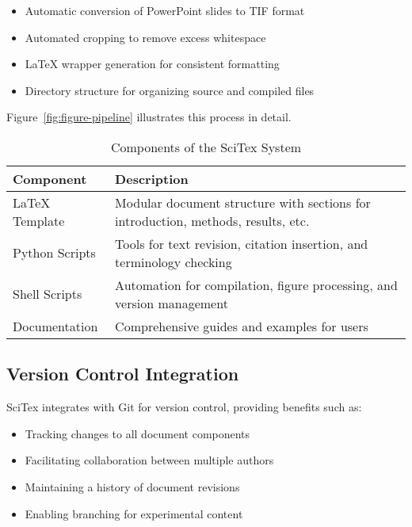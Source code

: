 \documentclass[preprint,review,12pt]{elsarticle}\n
\begin{document}
\begin{itemize}
    \item Automatic conversion of PowerPoint slides to TIF format
    \item Automated cropping to remove excess whitespace
    \item LaTeX wrapper generation for consistent formatting
    \item Directory structure for organizing source and compiled files
\end{itemize}

Figure~\ref{fig:figure-pipeline} illustrates this process in detail.


\begin{table}[h!]
\centering
\caption{Components of the SciTex System}
\label{tab:components}
\begin{tabular}{lp{8cm}}
\hline
\textbf{Component} & \textbf{Description} \\
\hline
LaTeX Template & Modular document structure with sections for introduction, methods, results, etc. \\
Python Scripts & Tools for text revision, citation insertion, and terminology checking \\
Shell Scripts & Automation for compilation, figure processing, and version management \\
Documentation & Comprehensive guides and examples for users \\
\hline
\end{tabular}
\end{table}

\subsection{Version Control Integration}
\label{subsec:version-control}

SciTex integrates with Git for version control, providing benefits such as:

\begin{itemize}
    \item Tracking changes to all document components
    \item Facilitating collaboration between multiple authors
    \item Maintaining a history of document revisions
    \item Enabling branching for experimental content
\end{itemize}
\end{document}
